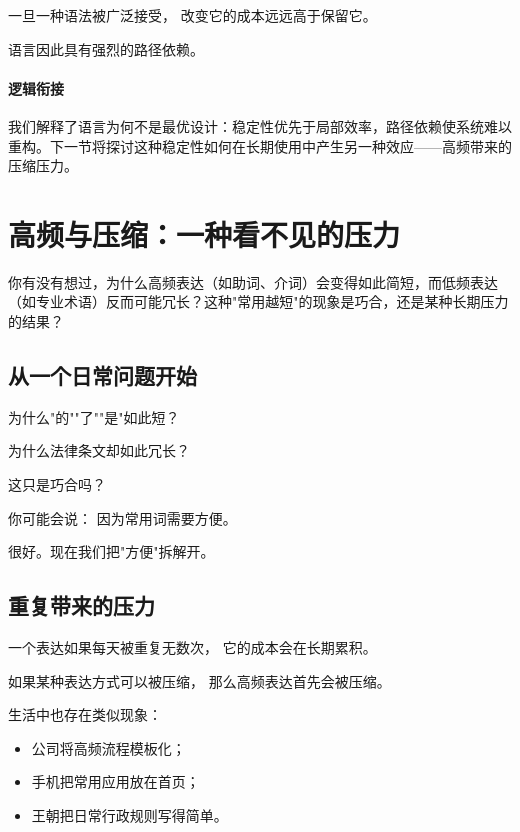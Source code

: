 \documentclass[openany, a4paper, 12pt]{book}
\begin{document}
一旦一种语法被广泛接受，
改变它的成本远远高于保留它。

语言因此具有强烈的路径依赖。

\paragraph*{逻辑衔接}
我们解释了语言为何不是最优设计：稳定性优先于局部效率，路径依赖使系统难以重构。下一节将探讨这种稳定性如何在长期使用中产生另一种效应——高频带来的压缩压力。


\section{高频与压缩：一种看不见的压力}

\begin{questionbox}
	你有没有想过，为什么高频表达（如助词、介词）会变得如此简短，而低频表达（如专业术语）反而可能冗长？这种"常用越短"的现象是巧合，还是某种长期压力的结果？
\end{questionbox}

\subsection{从一个日常问题开始}

为什么"的""了""是"如此短？

为什么法律条文却如此冗长？

这只是巧合吗？

\begin{tcolorbox}[colback=yellow!5,title=\textit{读者行为预测}]
	你可能会说：
	因为常用词需要方便。

	很好。现在我们把"方便"拆解开。
\end{tcolorbox}

\subsection{重复带来的压力}

一个表达如果每天被重复无数次，
它的成本会在长期累积。

如果某种表达方式可以被压缩，
那么高频表达首先会被压缩。

生活中也存在类似现象：

\begin{itemize}
	\item 公司将高频流程模板化；
	\item 手机把常用应用放在首页；
	\item 王朝把日常行政规则写得简单。
\end{itemize}
\end{document}
